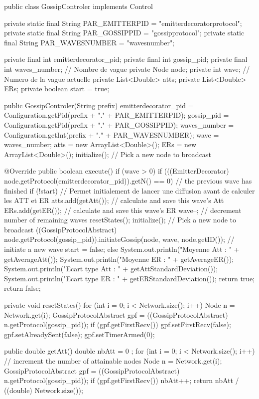 \documentclass[10pt]{report}
\begin{document}
\begin{boxedlisting}
public class GossipControler implements Control {	
	private static final String PAR_EMITTERPID = "emitterdecoratorprotocol";
	private static final String PAR_GOSSIPPID = "gossipprotocol";
	private static final String PAR_WAVESNUMBER = "wavesnumber";

	private final int emitterdecorator_pid;
	private final int gossip_pid;
	private final int waves_number; // Nombre de vague
	private Node node;
	private int wave; // Numero de la vague actuelle
	private List<Double> atts;
	private List<Double> ERs;
	private boolean start = true;

	public GossipControler(String prefix) {
		emitterdecorator_pid = Configuration.getPid(prefix + "." + PAR_EMITTERPID);
		gossip_pid = Configuration.getPid(prefix + "." + PAR_GOSSIPPID);
		waves_number = Configuration.getInt(prefix + "." + PAR_WAVESNUMBER);
		wave = waves_number;
		atts = new ArrayList<Double>();
		ERs = new ArrayList<Double>();
		initialize(); // Pick a new node to broadcast
	}

	@Override
	public boolean execute() {
		if (wave > 0) {
			if (((EmitterDecorator) node.getProtocol(emitterdecorator_pid)).getN() == 0) { // the previous wave has finished
			if (!start) {// Permet initialement de lancer une diffusion avant de calculer les ATT et ER
					atts.add(getAtt()); // calculate and save this wave's Att
					ERs.add(getER()); // calculate and save this wave's ER
					wave--; // decrement number of remaining waves
					resetStates();
				}
				initialize(); // Pick a new node to broadcast
				((GossipProtocolAbstract) node.getProtocol(gossip_pid)).initiateGossip(node, wave, node.getID()); // initiate a new wave
				start = false;
			}
		} else {
			System.out.println("Moyenne Att : " + getAverageAtt());
			System.out.println("Moyenne ER : " + getAverageER());
			System.out.println("Ecart type Att : " + getAttStandardDeviation());
			System.out.println("Ecart type ER : " + getERStandardDeviation());
			return true;
		}
		return false;
	}

	private void resetStates() {
		for (int i = 0; i < Network.size(); i++) {
			Node n = Network.get(i);
			GossipProtocolAbstract gpf = ((GossipProtocolAbstract) n.getProtocol(gossip_pid));
			if (gpf.getFirstRecv()) {
				gpf.setFirstRecv(false);
				gpf.setAlreadySent(false);
			}
			gpf.setTimerArmed(0);
		}
	}


	public double getAtt() {
		double nbAtt = 0 ;
		for (int i = 0; i < Network.size(); i++) { // increment the number of attainable nodes
			Node n = Network.get(i);
			GossipProtocolAbstract gpf = ((GossipProtocolAbstract) n.getProtocol(gossip_pid));
			if (gpf.getFirstRecv()) {
				nbAtt++;
			}
		}
		return nbAtt / ((double) Network.size());
	}

}
\end{boxedlisting}
\end{document}
